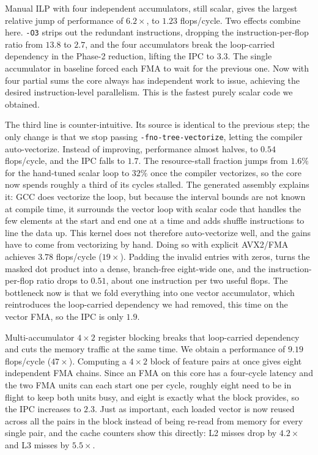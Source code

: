 \documentclass[letterpaper]{article}
\begin{document}
Manual ILP with four independent accumulators, still scalar, gives the largest relative jump of performance of $6.2\times$, to $1.23$ flops/cycle. Two effects combine here. \texttt{-O3} strips out the redundant instructions, dropping the instruction-per-flop ratio from $13.8$ to $2.7$, and the four accumulators break the loop-carried dependency in the Phase-2 reduction, lifting the IPC to $3.3$. The single accumulator in baseline forced each FMA to wait for the previous one. Now with four partial sums the core always has independent work to issue, achieving the desired instruction-level parallelism. This is the fastest purely scalar code we obtained.

The third line is counter-intuitive. Its source is identical to the previous step; the only change is that we stop passing \texttt{-fno-tree-vectorize}, letting the compiler auto-vectorize. Instead of improving, performance almost halves, to $0.54$ flops/cycle, and the IPC falls to $1.7$. The resource-stall fraction jumps from $1.6\%$ for the hand-tuned scalar loop to $32\%$ once the compiler vectorizes, so the core now spends roughly a third of its cycles stalled. The generated assembly explains it: GCC does vectorize the loop, but because the interval bounds are not known at compile time, it surrounds the vector loop with scalar code that handles the few elements at the start and end one at a time and adds shuffle instructions to line the data up. This kernel does not therefore auto-vectorize well, and the gains have to come from vectorizing by hand. Doing so with explicit AVX2/FMA achieves $3.78$ flops/cycle ($19\times$). Padding the invalid entries with zeros, turns the masked dot product into a dense, branch-free eight-wide one, and the instruction-per-flop ratio drops to $0.51$, about one instruction per two useful flops. The bottleneck now is that we fold everything into one vector accumulator, which reintroduces the loop-carried dependency we had removed, this time on the vector FMA, so the IPC is only $1.9$.

Multi-accumulator $4\times2$ register blocking breaks that loop-carried dependency and cuts the memory traffic at the same time. We obtain a performance of $9.19$ flops/cycle ($47\times$). Computing a $4\times2$ block of feature pairs at once gives eight independent FMA chains. Since an FMA on this core has a four-cycle latency and the two FMA units can each start one per cycle, roughly eight need to be in flight to keep both units busy, and eight is exactly what the block provides, so the IPC increases to $2.3$. Just as important, each loaded vector is now reused across all the pairs in the block instead of being re-read from memory for every single pair, and the cache counters show this directly: L2 misses drop by $4.2\times$ and L3 misses by $5.5\times$.
\end{document}
